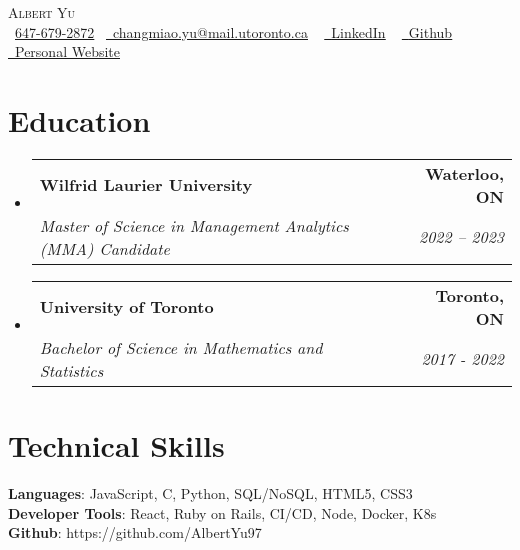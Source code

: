 \documentclass[letterpaper,11pt]{article}
\makeatletter
\newcommand{\resumeSubheading}[4]{
  \vspace{-2pt}\item
    \begin{tabular*}{1.0\textwidth}[t]{l@{\extracolsep{\fill}}r}
      \textbf{#1} & \textbf{\small #2} \\
      \textit{\small#3} & \textit{\small #4} \\
    \end{tabular*}\vspace{-7pt}
}
\newcommand{\resumeSubHeadingListStart}{\begin{itemize}[leftmargin=0.0in, label={}]}
\newcommand{\resumeSubHeadingListEnd}{\end{itemize}}
\makeatother
\begin{document}
\begin{center}
    {\Huge \scshape Albert Yu} \\ \vspace{1pt}
    \small \raisebox{-0.1\height}\faPhone\ \underline{647-679-2872}~ \href{changmiao.yu@mail.utoronto.ca}{\raisebox{-0.2\height}\faEnvelope\  \underline{changmiao.yu@mail.utoronto.ca}} ~ 
    \href{www.linkedin.com/in/albert-changmiao-yu}{\raisebox{-0.2\height}\faLinkedin\ \underline{LinkedIn}}  ~
    \href{https://github.com/AlbertYu97}{\raisebox{-0.2\height}\faGithub\ \underline{Github}}
    \href{https://albertyu97.github.io/Albert_Website_Design/}{\ \underline{Personal Website}}
    \vspace{-8pt}
\end{center}


\section{Education}
  \resumeSubHeadingListStart
    \resumeSubheading
      {Wilfrid Laurier University}{Waterloo, ON}
      {Master of Science in Management Analytics (MMA) Candidate}{2022 – 2023}
    \resumeSubheading
      {University of Toronto}{Toronto, ON}
      {Bachelor of Science in Mathematics and Statistics}{2017 - 2022}

  \resumeSubHeadingListEnd

  

%
\section{Technical Skills}
  \begin{itemize}[leftmargin=0.15in, label={}]
    \small{\item{
      \textbf{Languages}{: JavaScript, C, Python, SQL/NoSQL, HTML5, CSS3} \\
      \textbf{Developer Tools}{: React, Ruby on Rails, CI/CD, Node, Docker, K8s} \\
      \textbf{Github}{: https://github.com/AlbertYu97} \\
    }}
  \end{itemize}
\vspace{-16pt}

\end{document}

